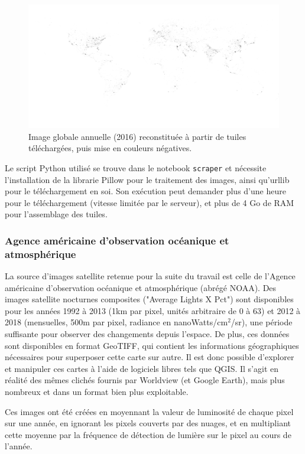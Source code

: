 \documentclass[a4paper, 11pt]{report}
\begin{document}
\begin{figure}
	\centering
	\includegraphics[width=0.8\paperheight, angle=-90, origin=c]{img/tiles_2016_zoom6.png}
	\caption{Image globale annuelle (2016) reconstituée à partir de tuiles téléchargées, puis mise en couleurs négatives.}
	\label{nasa-worldview-tiles}
\end{figure}

Le script Python utilisé se trouve dans le notebook \texttt{scraper} et nécessite l'installation de la librarie Pillow pour le traitement des images, ainsi qu'urllib pour le téléchargement en soi. Son exécution peut demander plus d'une heure pour le téléchargement (vitesse limitée par le serveur), et plus de 4 Go de RAM pour l'assemblage des tuiles.

\subsubsection{Agence américaine d'observation océanique et atmosphérique}
La source d'images satellite retenue pour la suite du travail est celle de l'Agence américaine d'observation océanique et atmosphérique (abrégé NOAA). Des images satellite nocturnes composites ("Average Lights X Pct") sont disponibles pour les années 1992 à 2013 \cite{noaa} (1km par pixel, unités arbitraire de 0 à 63) et 2012 à 2018 \cite{noaa-viirs} (mensuelles, 500m par pixel, radiance en nanoWatts/cm$^2$/sr), une période suffisante pour observer des changements depuis l'espace. De plus, ces données sont disponibles en format GeoTIFF, qui contient les informations géographiques nécessaires pour superposer cette carte sur autre. Il est donc possible d'explorer et manipuler ces cartes à l'aide de logiciels libres tels que QGIS. Il s'agit en réalité des mêmes clichés fournis par Worldview (et Google Earth), mais plus nombreux et dans un format bien plus exploitable.

Ces images ont été créées en moyennant la valeur de luminosité de chaque pixel sur une année, en ignorant les pixels couverts par des nuages, et en multipliant cette moyenne par la fréquence de détection de lumière sur le pixel au cours de l'année.
\end{document}
